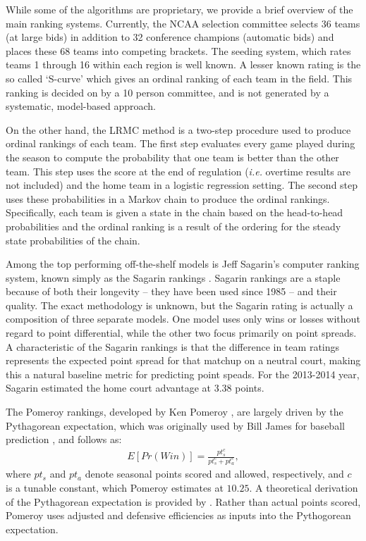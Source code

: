 \documentclass[letterpaper,12pt]{article}
\begin{document}
While some of the algorithms are proprietary, we provide a brief overview of the main ranking systems. Currently, the NCAA selection committee selects 36 teams (at large bids) in addition to 32 conference champions (automatic bids) and places these 68 teams into competing brackets. The seeding system, which rates teams 1 through 16 within each region is well known. A lesser known rating is the so called `S-curve' which gives an ordinal ranking of each team in the field. This ranking is decided on by a 10 person committee, and is not generated by a systematic, model-based approach. 

On the other hand, the LRMC method \citep{Kvam2006, mark2010} is a two-step procedure used to produce ordinal rankings of each team. The first step evaluates every game played during the season to compute the probability that one team is better than the other team. This step uses the score at the end of regulation (\emph{i.e.} overtime results are not included) and the home team in a logistic regression setting. The second step uses these probabilities in a Markov chain to produce the ordinal rankings. Specifically, each team is given a state in the chain based on the head-to-head probabilities and the ordinal ranking is a result of the ordering for the steady state probabilities of the chain.

Among the top performing off-the-shelf models is Jeff Sagarin's computer ranking system, known simply as the Sagarin rankings \citep{sagarin}. Sagarin rankings are a staple because of both their longevity -- they have been used since 1985 -- and their quality. The exact methodology is unknown, but the Sagarin rating is actually a composition of three separate models. One model uses only wins or losses without regard to point differential, while the other two focus primarily on point spreads. A characteristic of the Sagarin rankings is that the difference in team ratings represents the expected point spread for that matchup on a neutral court, making this a natural baseline metric for predicting point speads. For the 2013-2014 year, Sagarin estimated the home court advantage at 3.38 points.

The Pomeroy rankings, developed by Ken Pomeroy \citep{kenpom.com}, are largely driven by the Pythagorean expectation, which was originally used by Bill James for baseball prediction \citep{james}, and follows as:
\begin{eqnarray}
E[Pr(Win)] = \frac{pt_s^c}{pt_s^c + pt_a^c},
\end{eqnarray}
where $pt_s$ and $pt_a$ denote seasonal points scored and allowed, respectively, and $c$ is a tunable constant, which Pomeroy estimates at $10.25$.  
A theoretical derivation of the Pythagorean expectation is provided by \cite{miller2007}.
Rather than actual points scored, Pomeroy uses adjusted and defensive efficiencies as inputs into the Pythogorean expectation.
\end{document}
